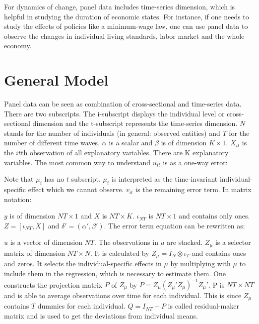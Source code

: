 \documentclass[11pt, a4paper, leqno]{article}
\begin{document}
For dynamics of change, panel data includes time-series dimension, which is helpful in studying the duration of economic states. For instance, if one needs to study the effects of policies like a minimum-wage law, one can use panel data to observe the changes in individual living standards, labor market and the whole economy.



\section{General Model}
\label{sec:General Model}



Panel data can be seen as combination of cross-sectional and time-series data. There are two subscripts. The i-subscript displays the individual level or cross-sectional dimension and the t-subscript represents the time-series dimension. $N$ stands for the number of individuals (in general: observed entities) and $T$ for the number of different time waves. $\alpha$ is a scalar and $\beta$ is of dimension $K\times1$. $X_{it}$ is the $it$th observation of all explanatory variables. There are K explanatory variables. The most common way to understand $u_{it}$ is as a one-way error:



Note that $\mu_i$ has no $t$ subscript. $\mu_i$ is interpreted as the time-invariant individual-specific effect which we cannot observe. $v_{it}$ is the remaining error term. In matrix notation:



$y$ is of dimension $NT\times1$ and $X$ is $NT\times K$. $\iota_{NT}$ is $NT\times1$ and contains only ones. $Z=[\iota_{NT},X]$ and $\delta'=(\alpha',\beta')$. The error term equation can be rewritten as:



$u$ is a vector of dimension $NT$. The observations in $u$ are stacked. $Z_{\mu}$ is a selector matrix of dimension $NT\times N$. It is calculated by $Z_{\mu}=I_N\otimes\iota_T$ and contains ones and zeros. It selects the individual-specific effects in $\mu$ by multiplying with $\mu$ to include them in the regression, which is necessary to estimate them. One constructs the projection matrix $P$ of $Z_{\mu}$ by $P=Z_{\mu}(Z_{\mu}'Z_{\mu})^{-1}Z_{\mu}'$. P is $NT\times NT$ and is able to average observations over time for each individual. This is since $Z_{\mu}$ contains $T$ dummies for each individual. $Q=I_{NT}-P$ is called residual-maker matrix and is used to get the deviations from individual means.
\end{document}
